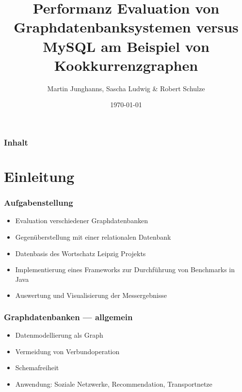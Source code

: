\documentclass{beamer}
\begin{document}
\let\todox\todo
\renewcommand\todo[1]{\vspace{0.3em}\todox[inline, size=\small , color=red!20]{#1}}

\title{Performanz Evaluation von Graphdatenbanksystemen versus MySQL am Beispiel von Kookkurrenzgraphen}
\author{Martin Junghanns, Sascha Ludwig \& Robert Schulze} 
\date{\today}

\begin{frame}
	\titlepage
\end{frame}

\begin{frame}\frametitle{Inhalt}
	\tableofcontents
\end{frame}

\section{Einleitung}

\begin{frame}\frametitle{Aufgabenstellung}
	\begin{itemize}
		\item Evaluation verschiedener Graphdatenbanken
		\item Gegenüberstellung mit einer relationalen Datenbank
		\item Datenbasis des Wortschatz Leipzig Projekts
		\item Implementierung eines Frameworks zur Durchführung von Benchmarks in Java
		\item Auswertung und Visualisierung der Messergebnisse
	\end{itemize} 
\end{frame}

\begin{frame}\frametitle{Graphdatenbanken --- allgemein}
	\begin{itemize}
		\item Datenmodellierung als Graph
		\item Vermeidung von Verbundoperation
		\item Schemafreiheit
		\item Anwendung: Soziale Netzwerke, Recommendation, Transportnetze
	\end{itemize} 
\end{frame}
\end{document}
